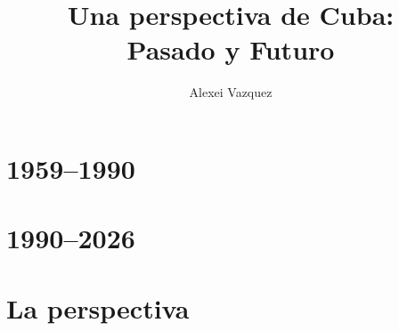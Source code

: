 \documentclass[10pt]{book}
\title{Una perspectiva de Cuba:\\Pasado y Futuro}
\author{Alexei Vazquez}
\date{}
\begin{document}
\maketitle

\setcounter{tocdepth}{1}
\tableofcontents




\part{1959--1990}






\part{1990--2026}







\part{La perspectiva}
















\end{document}

